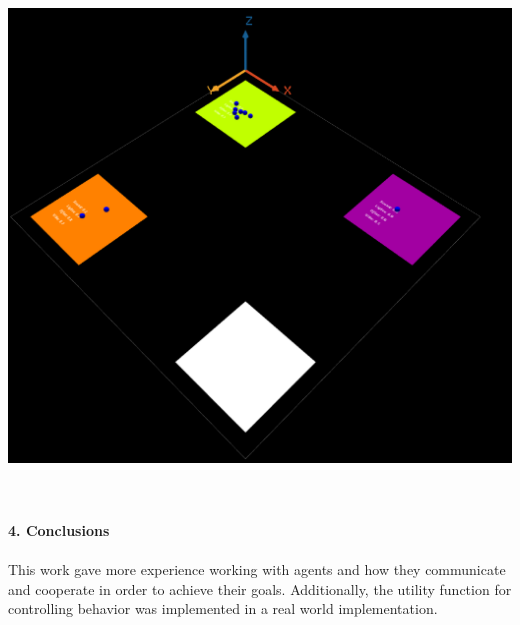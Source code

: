 \documentclass[a4paper,10pt]{article}
\begin{document}
\begin{center}{}
\centering\includegraphics[scale=0.3]{Dance.png}\par
\end{center}


\maketitle
\textbf
{\\\\4. Conclusions\\\\}
This work gave more experience working with agents and how they communicate and cooperate in order to achieve their goals. Additionally, the utility function for controlling behavior was implemented in a real world implementation.
\end{document}
